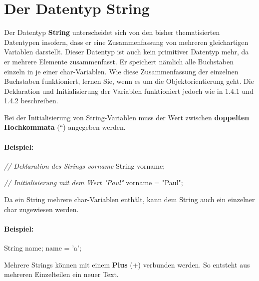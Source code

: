 \documentclass[10pt,paper=17cm:22cm, twoside=true, DIV=14]{scrbook}
\newenvironment {Shaded}
        {\begin{mdframed}[style=code] }
         {\end{mdframed}}
\newcommand{\StringTok}[1]{\textcolor[rgb]{0.4,0.4,0.4}{{#1}}}
\newcommand{\CommentTok}[1]{\textcolor[RGB]{128,128,128}{\textit{#1}}}
\newcommand{\NormalTok}[1]{#1}
\begin{document}
\section{Der Datentyp String}\label{der-datentyp-string-1}

Der Datentyp \textbf{String} unterscheidet sich von den bisher
thematisierten Datentypen insofern, dass er eine Zusammenfassung von
mehreren gleichartigen Variablen darstellt. Dieser Datentyp ist auch
kein primitiver Datentyp mehr, da er mehrere Elemente zusammenfasst. Er
speichert nämlich alle Buchstaben einzeln in je einer char-Variablen.
Wie diese Zusammenfassung der einzelnen Buchstaben funktioniert, lernen
Sie, wenn es um die Objektorientierung geht. Die Deklaration und
Initialisierung der Variablen funktioniert jedoch wie in 1.4.1 und 1.4.2
beschreiben.

Bei der Initialisierung von String-Variablen muss der Wert zwischen
\textbf{doppelten Hochkommata} (``) angegeben werden.

\paragraph{Beispiel:}\label{beispiel-16}

\begin{Shaded}
\begin{Highlighting}[]
\CommentTok{// Deklaration des Strings vorname}
\NormalTok{String vorname;}

\CommentTok{// Initialisierung mit dem Wert "Paul"}
\NormalTok{vorname = }\StringTok{"Paul"}\NormalTok{;}
\end{Highlighting}
\end{Shaded}

Da ein String mehrere char-Variablen enthält, kann dem String auch ein
einzelner char zugewiesen werden.

\paragraph{Beispiel:}\label{beispiel-17}

\begin{Shaded}
\begin{Highlighting}[]
\NormalTok{String name;}
\NormalTok{name = 'a';}
\end{Highlighting}
\end{Shaded}

Mehrere Strings können mit einem \textbf{Plus} (+) verbunden werden. So
entsteht aus mehreren Einzelteilen ein neuer Text.
\end{document}
